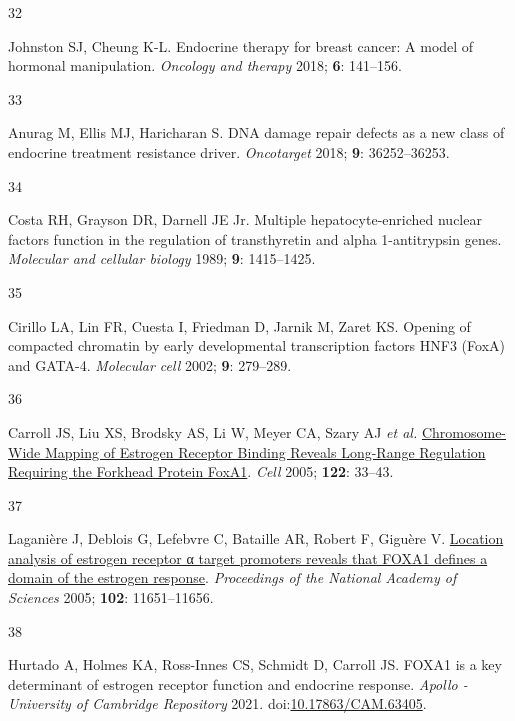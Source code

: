 \documentclass[
  11pt,
]{article}
\newlength{\cslhangindent}
\newlength{\csllabelwidth}
\newlength{\cslentryspacingunit} %
\newenvironment{CSLReferences}[2] %
 {%
  \setlength{\parindent}{0pt}
  \ifodd #1
  \let\oldpar\par
  \def\par{\hangindent=\cslhangindent\oldpar}
  \fi
  \setlength{\parskip}{#2\cslentryspacingunit}
 }%
 {}
\newcommand{\CSLLeftMargin}[1]{\parbox[t]{\csllabelwidth}{#1}}
\newcommand{\CSLRightInline}[1]{\parbox[t]{\linewidth - \csllabelwidth}{#1}\break}
\begin{document}
\begin{CSLReferences}{0}{0}
\leavevmode{}%
\CSLLeftMargin{32 }%
\CSLRightInline{Johnston SJ, Cheung K-L. Endocrine therapy for breast cancer: A model of hormonal manipulation. \emph{Oncology and therapy} 2018; \textbf{6}: 141--156.}

\leavevmode{}%
\CSLLeftMargin{33 }%
\CSLRightInline{Anurag M, Ellis MJ, Haricharan S. {DNA} damage repair defects as a new class of endocrine treatment resistance driver. \emph{Oncotarget} 2018; \textbf{9}: 36252--36253.}

\leavevmode{}%
\CSLLeftMargin{34 }%
\CSLRightInline{Costa RH, Grayson DR, Darnell JE Jr. Multiple hepatocyte-enriched nuclear factors function in the regulation of transthyretin and alpha 1-antitrypsin genes. \emph{Molecular and cellular biology} 1989; \textbf{9}: 1415--1425.}

\leavevmode{}%
\CSLLeftMargin{35 }%
\CSLRightInline{Cirillo LA, Lin FR, Cuesta I, Friedman D, Jarnik M, Zaret KS. Opening of compacted chromatin by early developmental transcription factors {HNF3} ({FoxA}) and {GATA-4}. \emph{Molecular cell} 2002; \textbf{9}: 279--289.}

\leavevmode{}%
\CSLLeftMargin{36 }%
\CSLRightInline{Carroll JS, Liu XS, Brodsky AS, Li W, Meyer CA, Szary AJ \emph{et al.} \href{https://doi.org/10.1016/j.cell.2005.05.008}{Chromosome-Wide Mapping of Estrogen Receptor Binding Reveals Long-Range Regulation Requiring the Forkhead Protein FoxA1}. \emph{Cell} 2005; \textbf{122}: 33--43.}

\leavevmode{}%
\CSLLeftMargin{37 }%
\CSLRightInline{Laganière J, Deblois G, Lefebvre C, Bataille AR, Robert F, Giguère V. \href{https://doi.org/10.1073/pnas.0505575102}{Location analysis of estrogen receptor α target promoters reveals that FOXA1 defines a domain of the estrogen response}. \emph{Proceedings of the National Academy of Sciences} 2005; \textbf{102}: 11651--11656.}

\leavevmode{}%
\CSLLeftMargin{38 }%
\CSLRightInline{Hurtado A, Holmes KA, Ross-Innes CS, Schmidt D, Carroll JS. FOXA1 is a key determinant of estrogen receptor function and endocrine response. \emph{Apollo - University of Cambridge Repository} 2021. doi:\href{https://doi.org/10.17863/CAM.63405}{10.17863/CAM.63405}.}


\end{CSLReferences}
\end{document}
